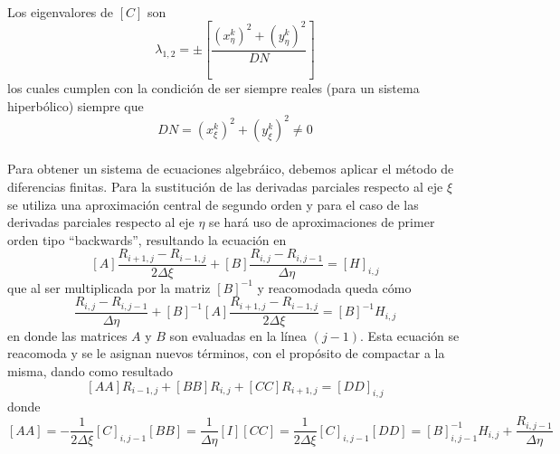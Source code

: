 \documentclass[letterpaper, openright, 12pt]{book}
\begin{document}
		\paragraph*{}
			Los eigenvalores de $\left[ C \right]$ son
			\begin{equation*}
				\lambda_{1, 2} = \pm \left[ \frac{\left(x_{\eta}^{k} \right)^2 + \left( y_{\eta}^{k} \right)^2} {DN} \right]
			\end{equation*}
			los cuales cumplen con la condición de ser siempre reales (para un sistema hiperbólico) siempre que
			\begin{equation*}
			DN = \left( x_{\xi}^{k} \right)^2 + \left( y_{\xi}^{k} \right)^2 \neq 0
			\end{equation*}
		 \paragraph*{}
			 Para obtener un sistema de ecuaciones algebráico, debemos aplicar el método de diferencias finitas. Para la sustitución de las derivadas parciales respecto al eje $\xi$ se utiliza una aproximación central de segundo orden y para el caso de las derivadas parciales respecto al eje $\eta$ se hará uso de aproximaciones de primer orden tipo ``backwards'', resultando la ecuación en
			 \begin{equation}
				 \left[ A \right] \frac{R_{i + 1, j} - R_{i - 1, j}}{2 \Delta \xi} + \left[ B \right] \frac{R_{i, j} - R_{i, j - 1}}{\Delta \eta} = \left[ H \right]_{i, j}
			 \end{equation}
			 que al ser multiplicada por la matriz $\left[ B \right]^{-1}$ y reacomodada queda cómo
			 \begin{equation}
				 \frac{R_{i, j} - R_{i, j-1} }{\Delta \eta} + \left[ B \right]^{-1} \left[ A \right] \frac{R_{i + 1, j} - R_{i - 1, j} }{2 \Delta \xi} = \left[ B \right]^{-1} H_{i, j}
			 \end{equation}
			 en donde las matrices $A$ y $B$ son evaluadas en la línea $(j - 1)$. Esta ecuación se reacomoda y se le asignan nuevos términos, con el propósito de compactar a la misma, dando como resultado
			 \begin{equation}
				 \left[ AA \right] R_{i - 1, j} + \left[ BB \right] R_{i, j} + \left[ CC \right] R_{i + 1, j} = \left[ DD \right]_{i, j}
				 \label{ec-hyper-final}
			 \end{equation}
			 donde
			 \begin{subequations}
			 	\begin{equation*}
				 	\left[ AA \right] = - \frac{1}{2 \Delta \xi} \left[ C \right]_{i, j - 1}
			 	\end{equation*}
				\begin{equation*}
					\left[ BB \right] = \frac{1}{\Delta \eta} \left[ I \right]
				\end{equation*}
				\begin{equation*}
					\left[ CC \right] = \frac{1}{2 \Delta \xi} \left[ C \right]_{i, j - 1}
				\end{equation*}
				\begin{equation*}
				\left[ DD \right] = \left[ B \right]_{i, j - 1}^{-1} H_{i, j} + \frac{R_{i, j-1}}{\Delta \eta}
				\end{equation*}
			 \end{subequations}
\end{document}
